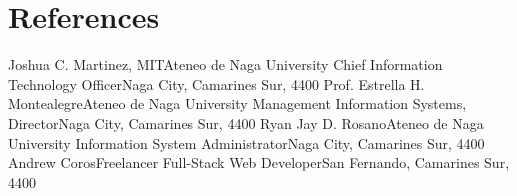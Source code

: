 \section{References}

\resumeSubHeadingListStart
    \resumeSubheading
    {Joshua C. Martinez, MIT}{Ateneo de Naga University}
    {Chief Information Technology Officer}{Naga City, Camarines Sur, 4400}
    \resumeItemListStart
    \resumeItemListEnd
    \resumeSubheading
    {Prof. Estrella H. Montealegre}{Ateneo de Naga University}
    {Management Information Systems, Director}{Naga City, Camarines Sur, 4400}
    \resumeItemListStart
    \resumeItemListEnd
    \resumeSubheading
    {Ryan Jay D. Rosano}{Ateneo de Naga University}
    {Information System Administrator}{Naga City, Camarines Sur, 4400}
    \resumeItemListStart
    \resumeItemListEnd
    \resumeSubheading
    {Andrew Coros}{Freelancer}
    {Full-Stack Web Developer}{San Fernando, Camarines Sur, 4400}
    \resumeItemListStart
    \resumeItemListEnd
\resumeSubHeadingListEnd